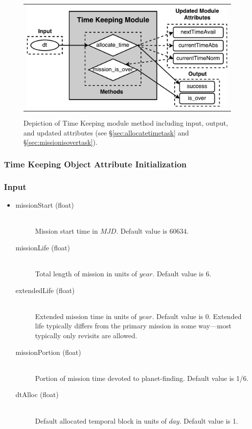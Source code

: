 \documentclass[cleanfoot]{asme2ej}
\begin{document}
\begin{figure}[ht]
    \begin{center}
        \begin{tabular}{c}
             \includegraphics[width=\textwidth]{TimeKeepingTasks2}
        \end{tabular}
    \end{center}
    \caption{\label{fig:timekeepingmodule} Depiction of Time Keeping module method including input, output, and updated attributes (see \S\ref{sec:allocatetimetask} and \S\ref{sec:missionisovertask}).}
\end{figure}

\subsubsection{Time Keeping Object Attribute Initialization}

\subsubsection*{Input}
\begin{itemize}
\item
\begin{description}
    \item[missionStart (float)] \hfill \\ Mission start time in $ MJD $. Default value is 60634.
    \item[missionLife (float)] \hfill \\ Total length of mission in units of $ year $. Default value is 6.
    \item[extendedLife (float)] \hfill \\ Extended mission time in units of $ year $. Default value is 0.  Extended life typically differs from the primary mission in some way---most typically only revisits are allowed.
    \item[missionPortion (float)] \hfill \\ Portion of mission time devoted to planet-finding. Default value is 1/6.
    \item[dtAlloc (float)] \hfill \\ Default allocated temporal block in units of $ day $. Default value is 1.
\end{description}
\end{itemize}
\end{document}
